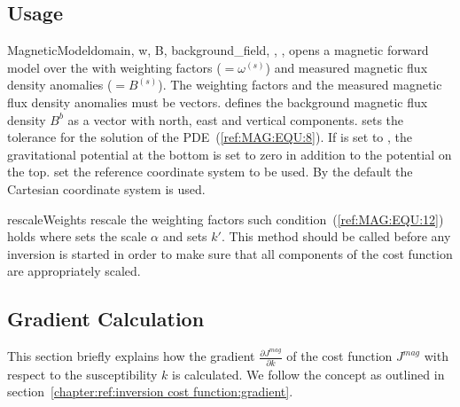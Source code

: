 \subsection{Usage}

\begin{classdesc}{MagneticModel}{domain, w, B, background_field,
        ,
        ,
}
opens a magnetic forward model over the \Domain {} with 
weighting factors  ($=\omega^{(s)}$) and measured magnetic flux
density anomalies  ($=B^{(s)}$).
The weighting factors and the  measured magnetic flux density anomalies must be vectors.
 defines the background magnetic flux density $B^b$
as a vector with north, east and vertical components. 
 sets the tolerance for the solution of the PDE~(\ref{ref:MAG:EQU:8}).
If  is set to  \True, the gravitational potential 
at the bottom is set to zero in addition to the potential on the top. 
 set the reference coordinate system to be used. By the default the 
Cartesian coordinate system is used.
\end{classdesc}

\begin{methoddesc}[MagneticModel]{rescaleWeights}{
 }
rescale the weighting factors such condition~(\ref{ref:MAG:EQU:12}) holds where 
 sets the scale $\alpha$
and  sets $k'$. This method should be called before any inversion is started
in order to make sure that all components of the cost function are appropriately scaled.
\end{methoddesc}


\subsection{Gradient Calculation}
This section briefly explains how the gradient
$\frac{\partial J^{mag}}{\partial k}$ of the cost function $J^{mag}$ with
respect to the susceptibility $k$ is calculated.  We follow the concept as outlined in section~\ref{chapter:ref:inversion cost function:gradient}.

